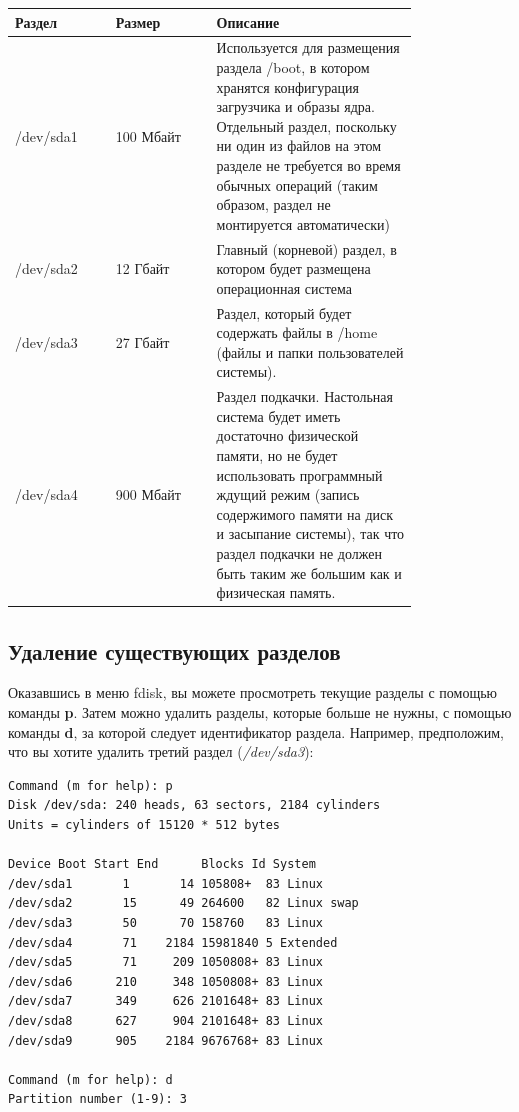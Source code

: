 \documentclass[10pt]{book}
\begin{document}
{\scriptsize\begin{center}
\begin{tabular}{|p{0.2\linewidth}|p{0.2\linewidth}|p{0.4\linewidth}|}
\hline
Раздел & Размер & Описание \\ \hline 
/dev/sda1 & 100 Мбайт & Используется для размещения раздела /boot, в котором хранятся конфигурация загрузчика и образы ядра. Отдельный раздел, поскольку ни один из файлов на этом разделе не требуется во время обычных операций (таким образом, раздел не монтируется автоматически)\\ \hline 
/dev/sda2 & 12 Гбайт & Главный (корневой) раздел, в котором будет размещена операционная система  \\ \hline
/dev/sda3 & 27 Гбайт & Раздел, который будет содержать файлы в /home (файлы и папки пользователей системы). \\ \hline
/dev/sda4 & 900 Мбайт & Раздел подкачки. Настольная система будет иметь достаточно физической памяти, но не будет использовать программный ждущий режим (запись содержимого памяти на диск и засыпание системы), так что раздел подкачки не должен быть таким же большим как и физическая память. \\
\hline
\end{tabular}
\end{center}}

\subsection{Удаление существующих разделов}

Оказавшись в меню fdisk, вы можете просмотреть текущие разделы с помощью команды \textbf{p}. Затем можно удалить разделы, которые больше не нужны, с помощью команды \textbf{d}, за которой следует идентификатор раздела. Например, предположим, что вы хотите удалить третий раздел (\textit{/dev/sda3}):

\begin{tcolorbox} 
\begin{lstlisting}
Command (m for help): p
Disk /dev/sda: 240 heads, 63 sectors, 2184 cylinders
Units = cylinders of 15120 * 512 bytes

Device Boot Start End      Blocks Id System
/dev/sda1       1       14 105808+  83 Linux
/dev/sda2       15      49 264600   82 Linux swap
/dev/sda3       50      70 158760   83 Linux
/dev/sda4       71    2184 15981840 5 Extended
/dev/sda5       71     209 1050808+ 83 Linux
/dev/sda6      210     348 1050808+ 83 Linux
/dev/sda7      349     626 2101648+ 83 Linux
/dev/sda8      627     904 2101648+ 83 Linux
/dev/sda9      905    2184 9676768+ 83 Linux

Command (m for help): d
Partition number (1-9): 3
\end{lstlisting}
\end{tcolorbox}
\end{document}
